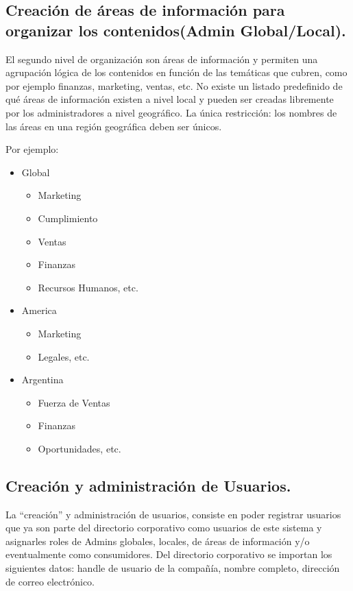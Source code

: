 \subsection{Creación de áreas de información para organizar los contenidos(Admin Global/Local).}

El segundo nivel de organización son áreas de información y permiten una agrupación lógica de los contenidos en función de las temáticas que cubren, como por ejemplo finanzas, marketing, ventas, etc. No existe un listado predefinido de qué áreas de información existen a nivel local y pueden ser creadas libremente por los administradores a nivel geográfico. La única restricción: los nombres de las áreas en una región geográfica deben ser únicos.


Por ejemplo:

\begin{itemize}
\item Global
    \begin{itemize}
        \item Marketing
        \item Cumplimiento
        \item Ventas
        \item Finanzas
        \item Recursos Humanos, etc.
    \end{itemize}
	\item America
		\begin{itemize}
		    \item Marketing
            \item Legales, etc.
        \end{itemize}
	\item Argentina
        \begin{itemize}
            \item Fuerza de Ventas
            \item Finanzas
            \item Oportunidades, etc.	
        \end{itemize}
\end{itemize}

\subsection{Creación y administración de Usuarios.}

La “creación” y administración de usuarios, consiste en poder registrar usuarios que ya son parte del directorio corporativo como usuarios de este sistema y asignarles roles de Admins globales, locales, de áreas de información y/o eventualmente como consumidores. Del directorio corporativo se importan los siguientes datos: handle de usuario de la compañía, nombre completo, dirección de correo electrónico.

